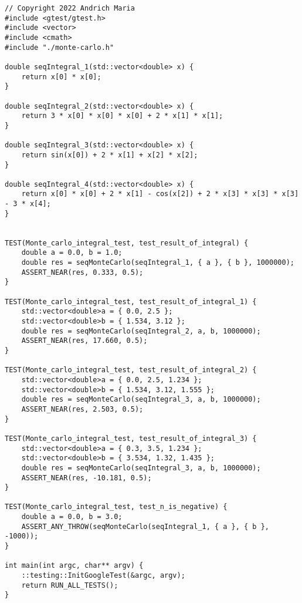 \documentclass{report}
\begin{document}
\begin{lstlisting}
// Copyright 2022 Andrich Maria
#include <gtest/gtest.h>
#include <vector>
#include <cmath>
#include "./monte-carlo.h"

double seqIntegral_1(std::vector<double> x) {
    return x[0] * x[0];
}

double seqIntegral_2(std::vector<double> x) {
    return 3 * x[0] * x[0] * x[0] + 2 * x[1] * x[1];
}

double seqIntegral_3(std::vector<double> x) {
    return sin(x[0]) + 2 * x[1] + x[2] * x[2];
}

double seqIntegral_4(std::vector<double> x) {
    return x[0] * x[0] + 2 * x[1] - cos(x[2]) + 2 * x[3] * x[3] * x[3] - 3 * x[4];
}


TEST(Monte_carlo_integral_test, test_result_of_integral) {
    double a = 0.0, b = 1.0;
    double res = seqMonteCarlo(seqIntegral_1, { a }, { b }, 1000000);
    ASSERT_NEAR(res, 0.333, 0.5);
}

TEST(Monte_carlo_integral_test, test_result_of_integral_1) {
    std::vector<double>a = { 0.0, 2.5 };
    std::vector<double>b = { 1.534, 3.12 };
    double res = seqMonteCarlo(seqIntegral_2, a, b, 1000000);
    ASSERT_NEAR(res, 17.660, 0.5);
}

TEST(Monte_carlo_integral_test, test_result_of_integral_2) {
    std::vector<double>a = { 0.0, 2.5, 1.234 };
    std::vector<double>b = { 1.534, 3.12, 1.555 };
    double res = seqMonteCarlo(seqIntegral_3, a, b, 1000000);
    ASSERT_NEAR(res, 2.503, 0.5);
}

TEST(Monte_carlo_integral_test, test_result_of_integral_3) {
    std::vector<double>a = { 0.3, 3.5, 1.234 };
    std::vector<double>b = { 3.534, 1.32, 1.435 };
    double res = seqMonteCarlo(seqIntegral_3, a, b, 1000000);
    ASSERT_NEAR(res, -10.181, 0.5);
}

TEST(Monte_carlo_integral_test, test_n_is_negative) {
    double a = 0.0, b = 3.0;
    ASSERT_ANY_THROW(seqMonteCarlo(seqIntegral_1, { a }, { b }, -1000));
}

int main(int argc, char** argv) {
    ::testing::InitGoogleTest(&argc, argv);
    return RUN_ALL_TESTS();
}
\end{lstlisting}
\end{document}
